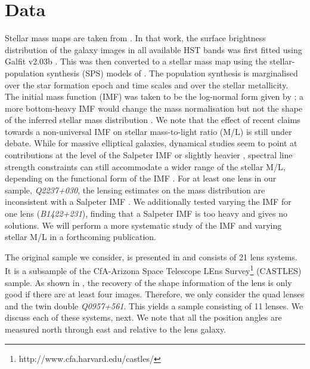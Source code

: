 \documentclass[useAMS,usenatbib]{mn2e}
\begin{document}
\section{Data}\label{sec:data}
Stellar mass maps are taken from \citet{2011ApJ...740...97L}. In that work, the surface brightness distribution of the galaxy images in all available HST bands was first fitted using {\sc Galfit v2.03b} \citep{2002AJ....124..266P}. This was then converted to a stellar mass map using the stellar-population synthesis (SPS) models of \citet{2003MNRAS.344.1000B}. The population synthesis is marginalised over the star formation epoch and time scales and over the stellar metallicity. The initial mass function (IMF) was taken to be the log-normal form given by \citet{2003PASP..115..763C}; a more bottom-heavy IMF would change the mass normalisation \citep[cf.][]{2014ApJ...793...96S} but not the shape of the inferred stellar mass distribution \citep[unless the IMF presents significant intrinsic deviations locally, see e.g.][]{2015MNRAS.447.1033M}. We note that the effect of recent claims towards a non-universal IMF on stellar mass-to-light ratio (M/L) is still under debate. While for massive elliptical galaxies, dynamical studies seem to point at contributions at the level of the Salpeter IMF or slightly heavier \citep{2013MNRAS.432.1862C}, spectral line strength constraints can still accommodate a wider range of the stellar M/L, depending on the functional form of the IMF \citep{2013MNRAS.429L..15F}. For at least one lens in our sample, \textit{Q2237+030}, the lensing estimates on the mass distribution are inconsistent with a Salpeter IMF \citep{2010MNRAS.409L..30F}. We additionally tested varying the IMF for one lens ({\it B1422+231}), finding that a Salpeter IMF is too heavy and gives no solutions. We will perform a more systematic study of the IMF and varying stellar M/L in a forthcoming publication.

The original sample we consider, is presented in \citet{2011ApJ...740...97L} and consists of 21 lens systems. It is a subsample of the CfA-Arizona Space Telescope LEns Survey\footnote{http://www.cfa.harvard.edu/castles/} (CASTLES) sample. As shown in \citet{2014MNRAS.445.2181C}, the recovery of the shape information of the lens is only good if there are at least four images. Therefore, we only consider the quad lenses and the twin double \textit{Q0957+561}. This yields a sample consisting of 11 lenses. We discuss each of these systems, next. We note that all the position angles are measured north through east and relative to the lens galaxy.
\end{document}
